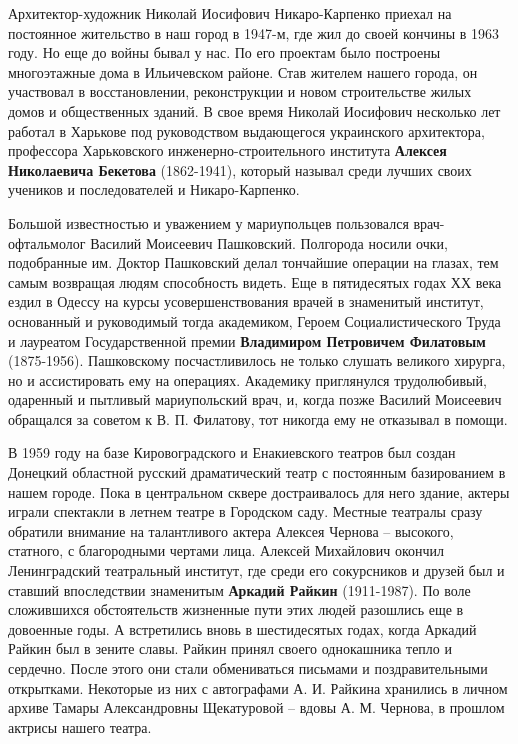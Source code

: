 
Архитектор-художник Николай Иосифович Никаро-Карпенко приехал на постоянное
жительство в наш город в 1947-м, где жил до своей кончины в 1963 году. Но еще
до войны бывал у нас. По его проектам было построены многоэтажные дома в
Ильичевском районе. Став жителем нашего города, он участвовал в восстановлении,
реконструкции и новом строительстве жилых домов и общественных зданий. В свое
время Николай Иосифович несколько лет работал в Харькове под руководством
выдающегося украинского архитектора, профессора Харьковского
инженерно-строительного института \textbf{Алексея Николаевича Бекетова} (1862-1941),
который называл среди лучших своих учеников и последователей и Никаро-Карпенко. 


Большой известностью и уважением у мариупольцев пользовался врач-офтальмолог
Василий Моисеевич Пашковский. Полгорода носили очки, подобранные им. Доктор
Пашковский делал тончайшие операции на глазах, тем самым возвращая людям
способность видеть. Еще в пятидесятых годах ХХ века ездил в Одессу на курсы
усовершенствования врачей в знаменитый институт, основанный и руководимый тогда
академиком, Героем Социалистического Труда и лауреатом Государственной премии
\textbf{Владимиром Петровичем Филатовым} (1875-1956). Пашковскому посчастливилось не
только слушать великого хирурга, но и ассистировать ему на операциях. Академику
приглянулся трудолюбивый, одаренный и пытливый мариупольский врач, и, когда
позже Василий Моисеевич обращался за советом к В. П. Филатову, тот никогда ему
не отказывал в помощи.


В 1959 году на базе Кировоградского и Енакиевского театров был создан Донецкий
областной русский драматический театр с постоянным базированием в нашем городе.
Пока в центральном сквере достраивалось для него здание, актеры играли
спектакли в летнем театре в Городском саду. Местные театралы сразу обратили
внимание на талантливого актера Алексея Чернова – высокого, статного, с
благородными чертами лица. Алексей Михайлович окончил Ленинградский театральный
институт, где среди его сокурсников и друзей был и ставший впоследствии
знаменитым \textbf{Аркадий Райкин} (1911-1987).  По воле сложившихся обстоятельств
жизненные пути этих людей разошлись еще в довоенные годы. А встретились вновь в
шестидесятых годах, когда Аркадий Райкин был в зените славы. Райкин принял
своего однокашника тепло и сердечно. После этого они стали обмениваться
письмами и поздравительными открытками. Некоторые из них с автографами А. И.
Райкина хранились в личном архиве Тамары Александровны Щекатуровой – вдовы А. М.
Чернова, в прошлом актрисы нашего театра.

